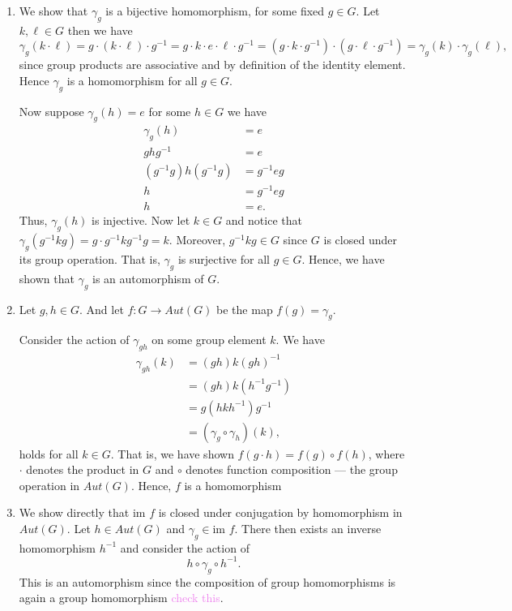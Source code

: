 \documentclass[12pt,letterpaper,boxed]{hmcpset}
\newcommand{\wg}[1]{\textcolor{violet}{#1}}
\newcommand{\im}{\text{im }}
\newcommand{\inv}{^{-1}}
\begin{document}
\begin{solution}
\begin{enumerate}
	\item We show that $\gamma_g$ is a bijective homomorphism, for
	some fixed $g \in G$.
	Let $k, \ell \in G$ then we have \[
	\gamma_g(k \cdot \ell) = g \cdot
	(k \cdot \ell) \cdot g\inv = g \cdot k \cdot e \cdot \ell \cdot
	g\inv = (g \cdot k \cdot g\inv) \cdot (g \cdot \ell \cdot g\inv) =
	\gamma_g(k) \cdot \gamma_g(\ell),
	\]
	since group products are associative and by definition of the
	identity element. Hence $\gamma_g$ is a homomorphism for all $g
	\in G$.

	Now suppose $\gamma_g(h) = e$ for some $h \in G$ we have 
	\begin{align*}
		\gamma_g(h) &= e \\
		ghg\inv &= e \\
		(g\inv g)h(g\inv g) &= g\inv e g\\
		h &= g\inv e g \\ 
		h &= e.
	\end{align*} 
	Thus, $\gamma_g(h)$ is injective. Now let $k \in G$ and notice
	that $\gamma_g(g\inv k g) = g\cdot g\inv k g\inv g = k$. Moreover,
	$g\inv k g \in G$ since $G$ is closed under its group operation.
	That is, $\gamma_g$ is surjective for all $g \in G$.
	Hence, we have shown that $\gamma_g$ is an automorphism of $G$.

	\item Let $g,h \in G$.
	And let $f: G \to Aut(G)$ be the map $f(g)
	= \gamma_g$. 
	
	Consider the action of $\gamma_{gh}$ on
	some group element $k$. We have
	\begin{align*}
		\gamma_{gh}(k) &= (gh) k (gh)\inv \\
			&= (gh) k (h\inv g\inv) \\ 
			&= g (h k h\inv) g\inv \\
			&= (\gamma_g \circ \gamma_h)(k),
	\end{align*}
	holds for all $k \in G$. That is, we have shown $f(g \cdot h) = f(g)
	\circ f(h)$, where $\cdot$ denotes the product in $G$ and $\circ$
	denotes function composition --- the group operation in $Aut(G)$.
	Hence, $f$ is a homomorphism

	\item We show directly that $\im f$ is closed under conjugation by
	homomorphism in $Aut(G)$. Let $h \in Aut(G)$ and $\gamma_g \in \im
	f$. There then exists an
	inverse homomorphism $h\inv$ and consider the action of \[
		h \circ \gamma_g \circ h\inv.
	\]
	This is an automorphism since the composition of group
	homomorphisms is again a group homomorphism \wg{check this}.


\end{enumerate}
\end{solution}
\end{document}
